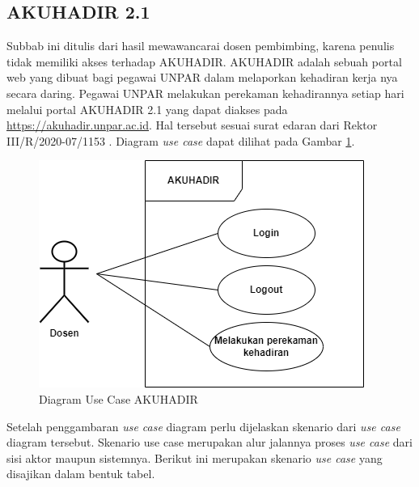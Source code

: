 \subsection{AKUHADIR 2.1}
\label{sec:akuhadir}
Subbab ini ditulis dari hasil mewawancarai dosen pembimbing, karena penulis tidak memiliki akses terhadap AKUHADIR. AKUHADIR adalah sebuah portal web yang dibuat bagi pegawai UNPAR dalam melaporkan kehadiran kerja nya secara daring. Pegawai UNPAR melakukan perekaman kehadirannya setiap hari melalui portal AKUHADIR 2.1 yang dapat diakses pada \url{https://akuhadir.unpar.ac.id}. Hal tersebut sesuai surat edaran dari Rektor III/R/2020-07/1153 \cite{akuhadir}. Diagram \textit{use case} dapat dilihat pada Gambar \ref{fig:usecaseDosen}.

\begin{figure}[H]
	\centering
	\includegraphics[scale=0.6]{Gambar/usecaseDosen.png}
	\caption{Diagram Use Case AKUHADIR} 
	\label{fig:usecaseDosen}
\end{figure}

Setelah penggambaran \textit{use case} diagram perlu dijelaskan skenario dari \textit{use case} diagram tersebut. Skenario use case merupakan alur jalannya proses \textit{use case} dari sisi aktor maupun sistemnya. Berikut ini merupakan skenario \textit{use case} yang disajikan dalam bentuk tabel.

